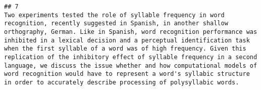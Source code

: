 \documentclass[
  english,
  man]{apa6}
\begin{document}
\begin{verbatim}
## 7                                                                                                                                                                                                                                                                                                                                                                                                                                                                                                                                                                                                                                                                                                                                                                                                                                                                                                                                                                                                                                                                                                                                                                                                                                                                                                                                                                                                                                                                                                                                                                                                                                                                                                                                                                                                                                                                                                                                                                                                                                          Two experiments tested the role of syllable frequency in word recognition, recently suggested in Spanish, in another shallow orthography, German. Like in Spanish, word recognition performance was inhibited in a lexical decision and a perceptual identification task when the first syllable of a word was of high frequency. Given this replication of the inhibitory effect of syllable frequency in a second language, we discuss the issue whether and how computational models of word recognition would have to represent a word's syllabic structure in order to accurately describe processing of polysyllabic words.

\end{verbatim}
\end{document}
